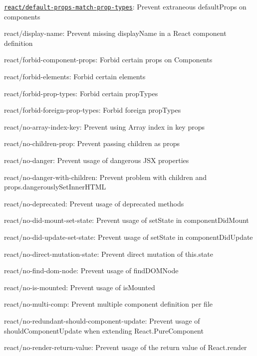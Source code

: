 \begin{DoxyItemize}
\item \href{docs/rules/default-props-match-prop-types}{\tt react/default-\/props-\/match-\/prop-\/types}\+: Prevent extraneous default\+Props on components
\item react/display-\/name\+: Prevent missing {\ttfamily display\+Name} in a React component definition
\item react/forbid-\/component-\/props\+: Forbid certain props on Components
\item react/forbid-\/elements\+: Forbid certain elements
\item react/forbid-\/prop-\/types\+: Forbid certain prop\+Types
\item react/forbid-\/foreign-\/prop-\/types\+: Forbid foreign prop\+Types
\item react/no-\/array-\/index-\/key\+: Prevent using Array index in {\ttfamily key} props
\item react/no-\/children-\/prop\+: Prevent passing children as props
\item react/no-\/danger\+: Prevent usage of dangerous J\+SX properties
\item react/no-\/danger-\/with-\/children\+: Prevent problem with children and props.\+dangerously\+Set\+Inner\+H\+T\+ML
\item react/no-\/deprecated\+: Prevent usage of deprecated methods
\item react/no-\/did-\/mount-\/set-\/state\+: Prevent usage of {\ttfamily set\+State} in {\ttfamily component\+Did\+Mount}
\item react/no-\/did-\/update-\/set-\/state\+: Prevent usage of {\ttfamily set\+State} in {\ttfamily component\+Did\+Update}
\item react/no-\/direct-\/mutation-\/state\+: Prevent direct mutation of {\ttfamily this.\+state}
\item react/no-\/find-\/dom-\/node\+: Prevent usage of {\ttfamily find\+D\+O\+M\+Node}
\item react/no-\/is-\/mounted\+: Prevent usage of {\ttfamily is\+Mounted}
\item react/no-\/multi-\/comp\+: Prevent multiple component definition per file
\item react/no-\/redundant-\/should-\/component-\/update\+: Prevent usage of {\ttfamily should\+Component\+Update} when extending React.\+Pure\+Component
\item react/no-\/render-\/return-\/value\+: Prevent usage of the return value of {\ttfamily React.\+render}

\end{DoxyItemize}
